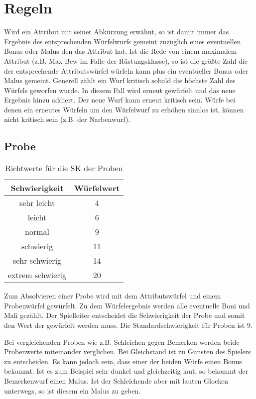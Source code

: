 \documentclass[../../Heldenanleitung2]{subfiles}
\begin{document}
\chapter{Regeln}

Wird ein Attribut mit seiner Abkürzung erwähnt, so ist damit immer das Ergebnis des entsprechenden Würfelwurfs gemeint zuzüglich eines eventuellen Bonus oder Malus den das Attribut hat. Ist die Rede von einem maximalem Attribut (z.B. Max Bew im Falle der Rüstungsklasse), so ist die größte Zahl die der entsprechende Attributswürfel würfeln kann plus ein eventueller Bonus oder Malus gemeint. Generell zählt ein Wurf kritisch sobald die höchste Zahl des Würfels geworfen wurde. In diesem Fall wird erneut gewürfelt und das neue Ergebnis hinzu addiert. Der neue Wurf kann erneut kritisch sein. Würfe bei denen ein erneutes Würfeln um den Würfelwurf zu erhöhen sinnlos ist, können nicht kritisch sein (z.B. der Narbenwurf).

\section{Probe}
\begin{table}
\caption{Richtwerte für die SK der Proben}
\centering
\begin{tabular}{|c|c|}
\hline
Schwierigkeit & Würfelwert \\
\hline
sehr leicht & 4\\
leicht & 6\\
normal & 9\\
schwierig & 11\\
sehr schwierig & 14\\
extrem schwierig & 20\\ \hline
\end{tabular}
\end{table}
Zum Absolvieren einer Probe wird mit dem Attributswürfel und einem Probenwürfel gewürfelt. Zu dem Würfelergebnis werden alle eventuelle Boni und Mali gezählt. Der Spielleiter entscheidet die Schwierigkeit der Probe und somit den Wert der gewürfelt werden muss. Die Standardschwierigkeit für Proben ist 9.

Bei vergleichenden Proben wie z.B. Schleichen gegen Bemerken werden beide Probenwerte miteinander verglichen. Bei Gleichstand ist zu Gunsten des Spielers zu entscheiden. Es kann jedoch sein, dass einer der beiden Würfe einen Bonus bekommt. Ist es zum Beispiel sehr dunkel und gleichzeitig laut, so bekommt der Bemerkenwurf einen Malus. Ist der Schleichende aber mit lauten Glocken unterwegs, so ist diesem ein Malus zu geben.
\end{document}
